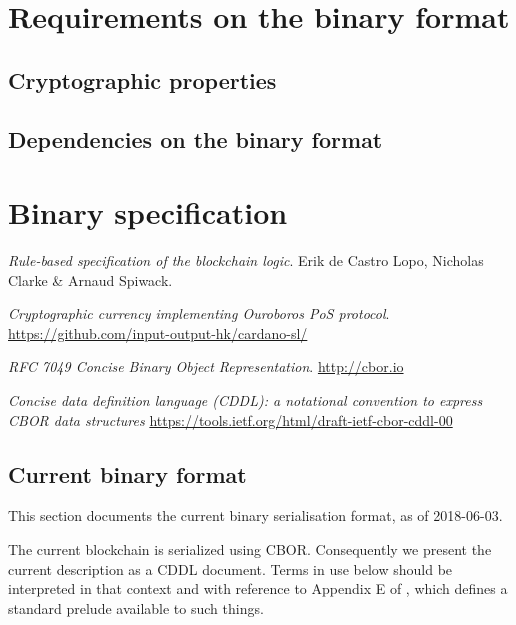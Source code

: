 \documentclass{article}
\begin{document}
\section{Requirements on the binary format}
\label{sec:reqs}

\subsection{Cryptographic properties}

\subsection{Dependencies on the binary format}

\section{Binary specification}
\label{sec:binfmt}

\begin{thebibliography}{9}
  \textit{Rule-based specification of the blockchain logic}.
  Erik de Castro Lopo, Nicholas Clarke \& Arnaud Spiwack.

  \textit{Cryptographic currency implementing Ouroboros PoS protocol}.
  \url{https://github.com/input-output-hk/cardano-sl/}

  \textit{RFC 7049 Concise Binary Object Representation}.
  \url{http://cbor.io}

  \textit{Concise data definition language (CDDL): a notational
    convention to express CBOR data structures}
  \url{https://tools.ietf.org/html/draft-ietf-cbor-cddl-00}

\end{thebibliography}

\begin{appendices}
  \section{Current binary format}
  \label{sec:currentfmt}

  This section documents the current binary serialisation format, as of
  2018-06-03.

  The current blockchain is serialized using CBOR\cite{cbor}. Consequently we
  present the current description as a CDDL\cite{cddl} document. Terms in use
  below should be interpreted in that context and with reference to Appendix E
  of \cite{cddl}, which defines a standard prelude available to such things.

  

\end{appendices}
\end{document}
